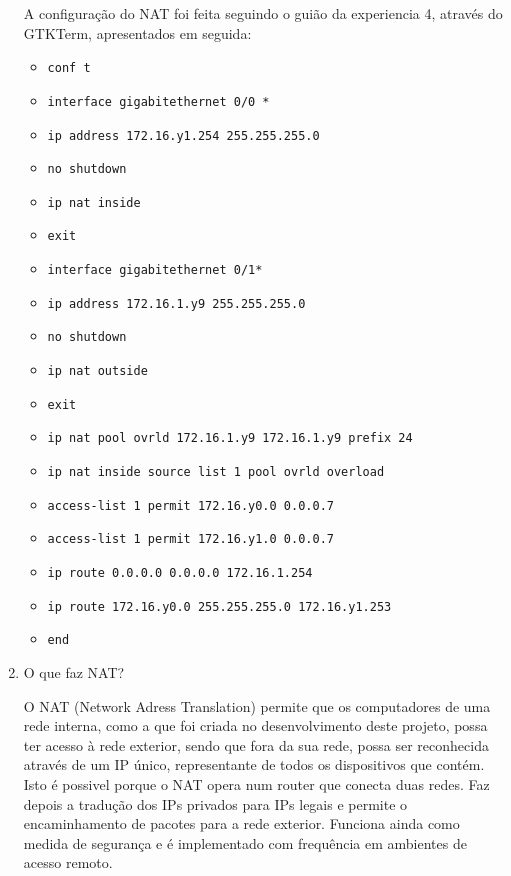 \documentclass{article}
\begin{document}
\begin{enumerate}
A configuração do NAT foi feita seguindo o guião da experiencia 4, através do GTKTerm, apresentados em seguida:
\begin{itemize}
    \item  \texttt{conf t}
    \item  \texttt{interface gigabitethernet 0/0 *}
    \item  \texttt{ip address 172.16.y1.254 255.255.255.0}
    \item  \texttt{no shutdown}
    \item  \texttt{ip nat inside}
    \item  \texttt{exit}
    \item  \texttt{interface gigabitethernet 0/1*}
    \item  \texttt{ip address 172.16.1.y9 255.255.255.0}
    \item  \texttt{no shutdown}
    \item  \texttt{ip nat outside}
    \item  \texttt{exit}
    \item  \texttt{ip nat pool ovrld 172.16.1.y9 172.16.1.y9 prefix 24}
    \item  \texttt{ip nat inside source list 1 pool ovrld overload}
    \item  \texttt{access-list 1 permit 172.16.y0.0 0.0.0.7}
    \item  \texttt{access-list 1 permit 172.16.y1.0 0.0.0.7}
    \item  \texttt{ip route 0.0.0.0 0.0.0.0 172.16.1.254}
    \item  \texttt{ip route 172.16.y0.0 255.255.255.0 172.16.y1.253}
    \item  \texttt{end}
\end{itemize}


\item O que faz NAT?

O NAT (Network Adress Translation) permite que os computadores de uma rede interna, como a que foi criada no desenvolvimento deste projeto, possa ter acesso à rede exterior, sendo que fora da sua rede, possa ser reconhecida através de um IP único, representante de todos os dispositivos que contém.
Isto é possivel porque o NAT opera num router que conecta duas redes. Faz depois a tradução dos IPs privados para IPs legais e permite o encaminhamento de pacotes para a rede exterior.
Funciona ainda como medida de segurança e é implementado com frequência em ambientes de acesso remoto.

\end{enumerate}
\end{document}
